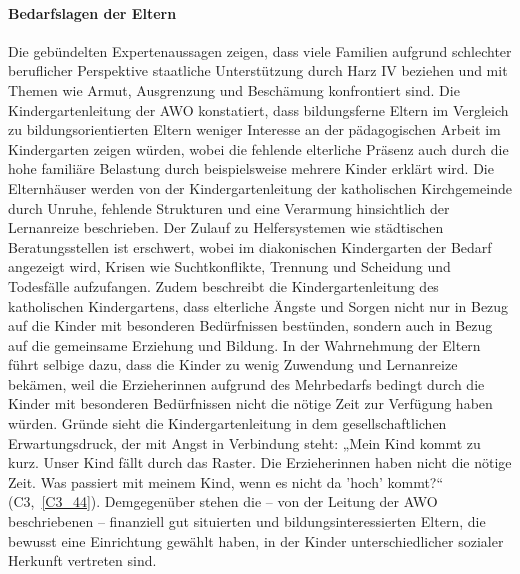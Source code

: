 \paragraph{Bedarfslagen der Eltern}
Die gebündelten Expertenaussagen zeigen, dass viele Familien aufgrund schlechter beruflicher Perspektive staatliche Unterstützung durch Harz IV beziehen und mit Themen wie Armut, Ausgrenzung und Beschämung konfrontiert sind. Die Kindergartenleitung der AWO konstatiert, dass bildungsferne Eltern im Vergleich zu bildungsorientierten Eltern weniger Interesse an der pädagogischen Arbeit im Kindergarten zeigen würden, wobei die fehlende elterliche Präsenz auch durch die hohe familiäre Belastung durch beispielsweise mehrere Kinder erklärt wird.
Die Elternhäuser werden von der Kindergartenleitung der katholischen Kirchgemeinde durch Unruhe, fehlende Strukturen und eine Verarmung hinsichtlich der Lernanreize beschrieben. Der Zulauf zu Helfersystemen wie städtischen Beratungsstellen ist erschwert, wobei im diakonischen Kindergarten der Bedarf angezeigt wird, Krisen wie Suchtkonflikte, Trennung und Scheidung und Todesfälle aufzufangen. Zudem beschreibt die Kindergartenleitung des katholischen Kindergartens, dass elterliche Ängste und Sorgen nicht nur in Bezug auf die Kinder mit besonderen Bedürfnissen bestünden, sondern auch in Bezug auf die gemeinsame Erziehung und Bildung. In der Wahrnehmung der Eltern führt selbige dazu, dass die Kinder zu wenig Zuwendung und Lernanreize bekämen, weil die Erzieherinnen aufgrund des Mehrbedarfs bedingt durch die Kinder mit besonderen Bedürfnissen nicht die nötige Zeit zur Verfügung haben würden. Gründe sieht die Kindergartenleitung in dem gesellschaftlichen Erwartungsdruck, der mit Angst in Verbindung steht: „Mein Kind kommt zu kurz. Unser Kind fällt durch das Raster. Die Erzieherinnen haben nicht die nötige Zeit. Was passiert mit meinem Kind, wenn es nicht da 'hoch' kommt?“ (C3,~\ref{C3_44}). Demgegenüber stehen die -- von der Leitung der AWO beschriebenen -- finanziell gut situierten und bildungsinteressierten Eltern, die bewusst eine Einrichtung gewählt haben, in der Kinder unterschiedlicher sozialer Herkunft vertreten sind.

